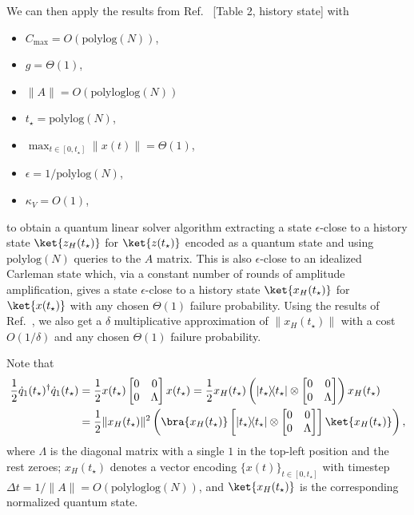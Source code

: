 \documentclass[superscriptaddress,onecolumn,nofootinbib,longbibliography,a4paper,accepted=2026-09-29]{quantumarticle}
\theoremstyle{plain}
\theoremstyle{definition}
\numberwithin{thm}{section}
\numberwithin{assumption}{section}
\numberwithin{lemma}{section}
\numberwithin{prop}{section}
\numberwithin{cor}{section}
\numberwithin{definition}{section}
\numberwithin{rmk}{section}
\numberwithin{equation}{section}
\newcommand{\ketbra}[2]   {\left|#1\middle\rangle\!\middle\langle#2\right|}
\begin{document}
We can then apply the results from Ref.~\cite{jennings2023cost} [Table 2, history state] with
\begin{itemize}
    \item $C_{\mathrm{max}} = O(\mathrm{polylog}(N))$,
    \item $g = \Theta(1)$,
    \item $\|A\| = O(\mathrm{polyloglog}(N))$
    \item $t_\star = \mathrm{polylog}(N)$,
    \item $\max_{t \in [0,t_\star]}\|x(t)\| = \Theta(1)$,
    \item $\epsilon = 1/\mathrm{poly log}(N)$,
    \item $\kappa_V=O(1)$,
\end{itemize}
to obtain a quantum linear solver algorithm extracting a state $\epsilon$-close to a history state $\ket{z_H(t_\star)}$ for $\ket{z(t_\star)}$ encoded as a quantum state and using $\mathrm{polylog}(N)$ queries to the $A$ matrix. This is also $\epsilon$-close to an idealized Carleman state which, via a constant number of rounds of amplitude amplification, gives a state $\epsilon$-close to a history state $\ket{x_H(t_\star)}$ for $\ket{x(t_\star)}$ with any chosen $\Theta(1)$ failure probability. Using the results of Ref.~\cite{dalzell2024shortcut}, we also get a $\delta$ multiplicative approximation of $\|x_H(t_\star)\|$ with a cost $O(1/\delta)$ and any chosen $\Theta(1)$ failure probability.

Note that 
\begin{align}
    \frac{1}{2} \dot{q}_1(t_\star)^\dag \dot{q}_1(t_\star) & =    \frac{1}{2} x(t_\star) \begin{bmatrix} 0 & 0 \\ 0 & \Lambda
    \end{bmatrix}
   x(t_\star) =   \frac{1}{2} x_H(t_\star) \left(\ketbra{t_\star}{t_\star} \otimes \begin{bmatrix} 0 & 0 \\ 0 & \Lambda 
    \end{bmatrix} \right)
   x_H(t_\star)  \\ & =
   \frac{1}{2}\| x_H(t_\star)\|^2 \left(\bra{x_H(t_\star)} \left[\ketbra{t_\star}{t_\star} \otimes  \begin{bmatrix} 0 & 0 \\ 0 & \Lambda 
    \end{bmatrix} \right] \ket{x_H(t_\star)}  \right),
\end{align}
where $\Lambda$ is the diagonal matrix with a single $1$ in the top-left position and the rest zeroes; $x_H(t_\star)$ denotes a vector encoding $\{x(t)\}_{t \in [0,t_\star]}$ with timestep $\Delta t = 1/\|A\| = O(\mathrm{polyloglog}(N))$, and $\ket{x_H(t_\star)}$ is the corresponding normalized quantum state. 
\end{document}
